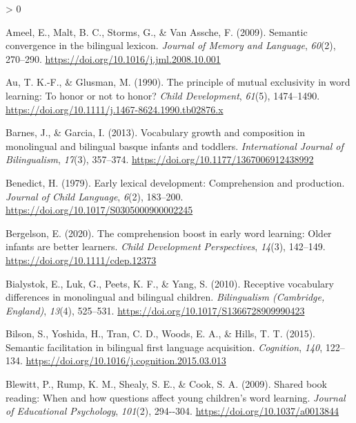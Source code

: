 \documentclass[
  english,
  ,man,floatsintext]{apa6}
\newlength{\cslhangindent}
\newenvironment{CSLReferences}[2] %
 {%
  \setlength{\parindent}{0pt}
  \ifodd #1 \everypar{\setlength{\hangindent}{\cslhangindent}}\ignorespaces\fi
  \ifnum #2 > 0
  \setlength{\parskip}{#2\baselineskip}
  \fi
 }%
 {}
\begin{document}
\hypertarget{refs}{}
\begin{CSLReferences}{1}{0}
\leavevmode\hypertarget{ref-Ameel_etal_2009}{}%
Ameel, E., Malt, B. C., Storms, G., \& Van Assche, F. (2009). Semantic convergence in the bilingual lexicon. \emph{Journal of Memory and Language}, \emph{60}(2), 270--290. \url{https://doi.org/10.1016/j.jml.2008.10.001}

\leavevmode\hypertarget{ref-Au_Glusman_1990}{}%
Au, T. K.-F., \& Glusman, M. (1990). The principle of mutual exclusivity in word learning: To honor or not to honor? \emph{Child Development}, \emph{61}(5), 1474--1490. \url{https://doi.org/10.1111/j.1467-8624.1990.tb02876.x}

\leavevmode\hypertarget{ref-Barnes_Garcia_2013}{}%
Barnes, J., \& Garcia, I. (2013). Vocabulary growth and composition in monolingual and bilingual basque infants and toddlers. \emph{International Journal of Bilingualism}, \emph{17}(3), 357--374. \url{https://doi.org/10.1177/1367006912438992}

\leavevmode\hypertarget{ref-Benedict_1979}{}%
Benedict, H. (1979). Early lexical development: Comprehension and production. \emph{Journal of Child Language}, \emph{6}(2), 183--200. \url{https://doi.org/10.1017/S0305000900002245}

\leavevmode\hypertarget{ref-Bergelson_2020}{}%
Bergelson, E. (2020). The comprehension boost in early word learning: Older infants are better learners. \emph{Child Development Perspectives}, \emph{14}(3), 142--149. \url{https://doi.org/10.1111/cdep.12373}

\leavevmode\hypertarget{ref-Bialystok_etal_2010}{}%
Bialystok, E., Luk, G., Peets, K. F., \& Yang, S. (2010). Receptive vocabulary differences in monolingual and bilingual children. \emph{Bilingualism (Cambridge, England)}, \emph{13}(4), 525--531. \url{https://doi.org/10.1017/S1366728909990423}

\leavevmode\hypertarget{ref-Bilson_etal_2015}{}%
Bilson, S., Yoshida, H., Tran, C. D., Woods, E. A., \& Hills, T. T. (2015). Semantic facilitation in bilingual first language acquisition. \emph{Cognition}, \emph{140}, 122--134. \url{https://doi.org/10.1016/j.cognition.2015.03.013}

\leavevmode\hypertarget{ref-Blewitt_etal_2009}{}%
Blewitt, P., Rump, K. M., Shealy, S. E., \& Cook, S. A. (2009). Shared book reading: When and how questions affect young children's word learning. \emph{Journal of Educational Psychology}, \emph{101}(2), 294-\/-304. \url{https://doi.org/10.1037/a0013844}


\end{CSLReferences}
\end{document}
